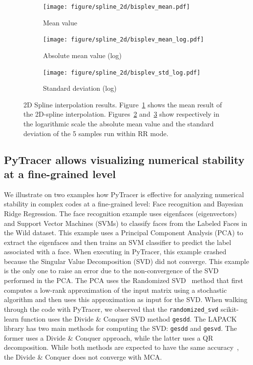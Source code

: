 \documentclass[10pt,journal,compsoc]{IEEEtran}
\newcommand{\pytracer}[0]{PyTracer\xspace}
\begin{document}
\begin{figure}
    \centering
    \begin{subfigure}{.3\linewidth}
        \centering
        \texttt{[image: figure/spline\_2d/bisplev\_mean.pdf]}
        \caption{Mean value}
        \label{fig:bisplev_mean}
    \end{subfigure}
    \begin{subfigure}{.3\linewidth}
        \centering
        \texttt{[image: figure/spline\_2d/bisplev\_mean\_log.pdf]}
        \caption{Absolute mean value (log)}
        \label{fig:bisplev_mean_log}
    \end{subfigure}
    \begin{subfigure}{.3\linewidth}
        \centering
        \texttt{[image: figure/spline\_2d/bisplev\_std\_log.pdf]}
        \caption{Standard deviation (log)}
        \label{fig:bisplev_std_log}
    \end{subfigure}
    \caption{2D Spline interpolation results. Figure~\ref{fig:bisplev_mean}
        shows the mean result of the 2D-spline interpolation.
        Figures~\ref{fig:bisplev_mean_log} and~\ref{fig:bisplev_std_log} show
        respectively in the logarithmic scale the absolute mean value and the
        standard deviation of the 5 samples run within RR mode. 
    }
    \label{fig:spline2d_rr}
\end{figure}

\subsection{\pytracer allows visualizing numerical stability at a fine-grained level}


We illustrate on two examples how PyTracer is effective for analyzing
numerical stability in complex codes at a fine-grained level: Face recognition and Bayesian Ridge Regression.
The face recognition example uses eigenfaces (eigenvectors) and Support Vector
Machines (SVMs) to classify faces from the Labeled Faces in the Wild dataset.
This example uses a Principal Component Analysis (PCA) to extract the eigenfaces
and then trains an SVM classifier to predict the label associated with a face.
When executing in PyTracer, this example crashed because the Singular Value Decomposition (SVD) did not converge.
This example is the only one to raise an error due to the
non-convergence of the SVD performed in the PCA.
The PCA uses the Randomized SVD~\cite{halko2011finding} method
that first computes a low-rank approximation of the input matrix using a
stochastic algorithm and then uses this approximation as input for the SVD. 
When walking through the code with PyTracer, we observed that
the \texttt{randomized\_svd} scikit-learn function uses the Divide \& Conquer SVD
method \texttt{gesdd}. The LAPACK library has two main methods for computing the SVD:
\texttt{gesdd} and \texttt{gesvd}. The former uses a Divide \& Conquer approach,
while the latter uses a QR decomposition. While both methods are expected to
have the same accuracy~\cite{nakatsukasa2013stable}, the Divide \& Conquer
does not converge with MCA.
\end{document}
